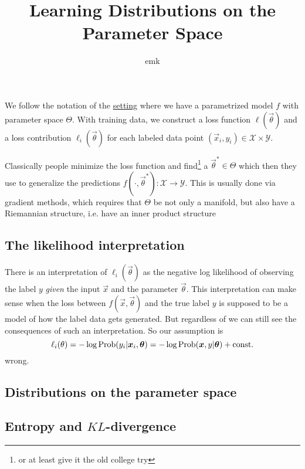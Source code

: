 \documentclass[12pt]{amsart}
\title{Learning Distributions on the Parameter Space}
\author{emk}
\begin{document}
\maketitle

We follow the notation of the \href{https://ekiral.github.io/blog/2025-06-05_notation.html}{setting} where we have a parametrized model $f$ with parameter space $\Theta$. With training data, we construct a loss function $\ell(\vec{\theta})$ and a loss contribution $\ell_i(\vec{\theta})$ for each labeled data point $(\vec{x}_i, y_i) \in \mathcal{X} \times \mathcal{Y}$. 

Classically people minimize the loss function and find\footnote{or at least give it the old college try} a $\vec{\theta}^* \in \Theta$ which then they use to generalize the predictions $f(\cdot, \vec{\theta}^*) : \mathcal{X} \to \mathcal{Y}$. This is usually done via gradient methods, which requires that $\Theta$ be not only a manifold, but also have a Riemannian structure, i.e. have an inner product structure 


\subsection*{The likelihood interpretation}

There is an interpretation of $\ell_i(\vec{\theta})$ as the negative log likelihood of observing  the label $y$ \emph{given} the input $\vec{x}$ and the parameter $\vec{\theta}$. This interpretation can make sense when the loss between $f(\vec{x}, \vec{\theta})$ and the true label $y$ is supposed to be a model of how the label data gets generated.  But regardless of  we can still see the consequences of such an interpretation. So our assumption is 
\[
	\ell_i(\theta) = -\log \operatorname{Prob}(y_i | \mathbf{\boldsymbol{x}}_i, \mathbf{\boldsymbol{\theta}}) = - \log \operatorname{Prob}(\mathbf{\boldsymbol{x}}, y | \mathbf{\boldsymbol{\theta}}) + \text{const.}
\] 
wrong.

\subsection*{Distributions on the parameter space} 
\subsection*{Entropy and $KL$-divergence} 
\end{document}
